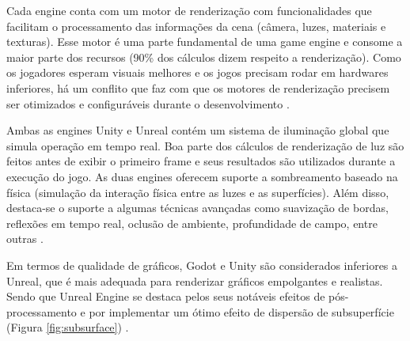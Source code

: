 Cada engine conta com um motor de renderização com funcionalidades que facilitam o processamento das informações da cena (câmera, luzes, materiais e texturas). Esse motor é uma parte fundamental de uma game engine e consome a maior parte dos recursos (90\% dos cálculos dizem respeito a renderização). Como os jogadores esperam visuais melhores e os jogos precisam rodar em hardwares inferiores, há um conflito que faz com que os motores de renderização precisem ser otimizados e configuráveis durante o desenvolvimento \cite{vsmid2017comparison}.

Ambas as engines Unity e Unreal contém um sistema de iluminação global que simula operação em tempo real. Boa parte dos cálculos de renderização de luz são feitos antes de exibir o primeiro frame e seus resultados são utilizados durante a execução do jogo. As duas engines oferecem suporte a sombreamento baseado na física (simulação da interação física entre as luzes e as superfícies). Além disso, destaca-se o suporte a algumas técnicas avançadas como suavização de bordas, reflexões em tempo real, oclusão de ambiente, profundidade de campo, entre outras \cite{compStudyGE}. 

Em termos de qualidade de gráficos, Godot e Unity são considerados inferiores a Unreal, que é mais adequada para renderizar gráficos empolgantes e realistas. Sendo que Unreal Engine se destaca pelos seus notáveis efeitos de pós-processamento e por implementar um ótimo efeito de dispersão de subsuperfície (Figura \ref{fig:subsurface}) \cite{compStudyGE}.

\begin{figure}[h!]
	\centering
\end{figure}
\nocite{subsurface}

